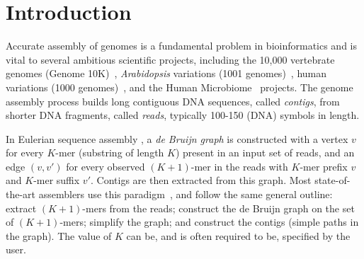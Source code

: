 \section{Introduction}\label{sec:introduction}


% 
% 
% 
% 

Accurate assembly of genomes is a fundamental problem in
bioinformatics and is vital to several ambitious scientific projects, including
the 10,000 vertebrate genomes (Genome 10K)~\cite{Haussler09}, \emph{Arabidopsis}
variations (1001 genomes)~\cite{Ossowski08}, human variations (1000
genomes)~\cite{Abecasis12}, and the Human Microbiome~\cite{hmp} projects. The
genome assembly process builds long contiguous DNA sequences, called {\em
contigs}, from shorter DNA fragments, called {\em reads}, typically 100-150
(DNA) symbols in length.


In Eulerian sequence assembly \cite{IW95,PTW}, a {\em de Bruijn graph} is
constructed with a vertex $v$ for every $K$-mer (substring of length $K$)
present in an input set of reads, and an edge $(v, v')$ for every observed $(K +
1)$-mer in the reads with $K$-mer prefix $v$ and $K$-mer suffix $v'$.  Contigs
are then extracted from this graph.  Most state-of-the-art assemblers use this
paradigm~\cite{bankevich2012spades,peng2010idba,Li:2010,Simpson:2009,Butler:2008}, 
and follow the same general outline: extract $(K + 1)$-mers from the reads;
construct the de Bruijn graph on the set of $(K +1)$-mers; simplify the graph; 
and construct the contigs (simple paths in the graph). The value of $K$ can be,
and is often required to be, specified by the user.

